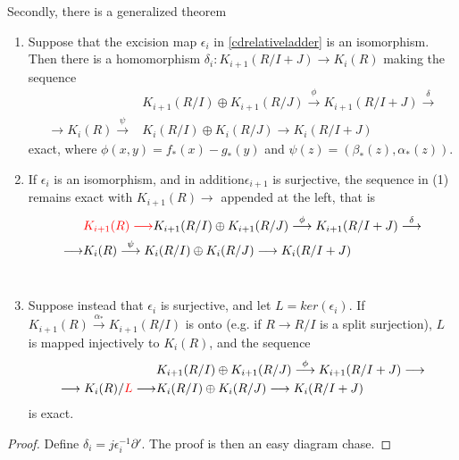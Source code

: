 	Secondly, there is a generalized theorem
	\begin{theorem}
	\begin{enumerate}
		\item  Suppose that the excision map $\epsilon_i$ in \ref{cdrelativeladder} is an isomorphism. Then there is a homomorphism $\delta_i \colon K_{i+1}(R/I+J)\longrightarrow K_i(R)$ making the sequence 
		\begin{align*}
		&K_{i+1}(R/I)\oplus K_{i+1}(R/J)\overset{\phi}\longrightarrow K_{i+1}(R/I+J)\overset{\delta} \longrightarrow \\
	\longrightarrow K_i(R) \overset{\psi}\longrightarrow & K_i(R/I)\oplus K_i(R/J)\longrightarrow K_i(R/I+J)
		\end{align*}	
exact, where $\phi(x,y)=f_*(x)-g_*(y)$ and $\psi(z)=(\beta_*(z),\alpha_*(z))$. \\
	\item If $\epsilon_i$ is an isomorphism, and in addition$\epsilon_{i+1}$ is surjective, the sequence in (1) remains exact with $K_{i+1}(R)\longrightarrow$  appended at the left, that is
	\begin{align*}
		&{\color{red} K_{i+1}(R) \longrightarrow} K_{i+1}(R/I)\oplus K_{i+1}(R/J)\overset{\phi}\longrightarrow K_{i+1}(R/I+J)\overset{\delta} \longrightarrow \\
	\longrightarrow &K_i(R) \overset{\psi}\longrightarrow K_i(R/I)\oplus K_i(R/J)\longrightarrow K_i(R/I+J)
		\end{align*} \\
	\item Suppose instead  that $\epsilon_i$  is  surjective,  and  let  $L =  ker(\epsilon_i)$. If
$K_{i+1}(R) \overset{\alpha_*}\longrightarrow K_{i+1}(R/I) $ is onto (e.g.  if $ R \longrightarrow  R/I$ is a split surjection), $L$ is mapped
injectively to $K_i(R)$, and the sequence
\begin{align*}
		&K_{i+1}(R/I)\oplus K_{i+1}(R/J)\overset{\phi}\longrightarrow K_{i+1}(R/I+J) \longrightarrow \\
	\longrightarrow K_i(R)/{\color{red}L} \longrightarrow & K_i(R/I)\oplus K_i(R/J)\longrightarrow K_i(R/I+J)
		\end{align*}
is exact.
	\end{enumerate}
	\end{theorem}
\begin{proof}
	Define  $\delta_i=j \epsilon_i^{-1}\partial'$. The proof is then an easy diagram chase.
\end{proof}

